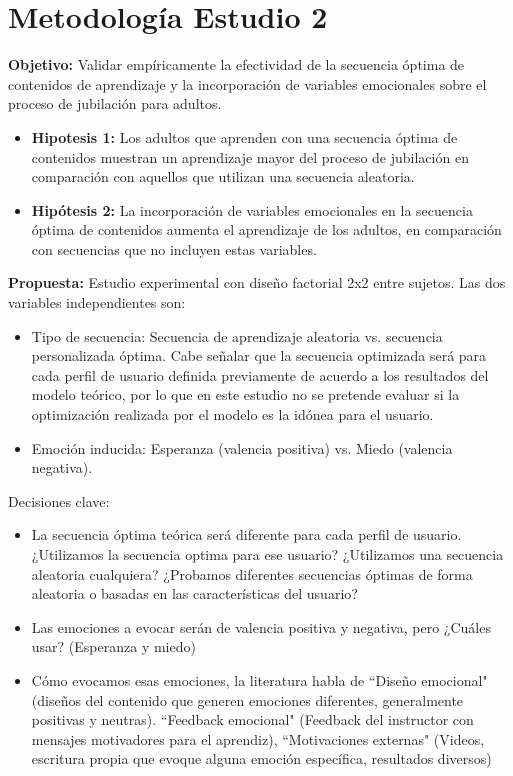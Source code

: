 \newpage

\section*{Metodología Estudio 2}

 \textbf{Objetivo:} Validar empíricamente la efectividad de la secuencia óptima de contenidos de aprendizaje y la incorporación de variables emocionales  sobre el proceso de jubilación para adultos.
 \begin{itemize}
     \item \textbf{Hipotesis 1:} Los adultos que aprenden con una secuencia óptima de contenidos muestran un aprendizaje mayor del proceso de jubilación en comparación con aquellos que utilizan una secuencia aleatoria.
     \item \textbf{Hipótesis 2:} La incorporación de variables emocionales en la secuencia óptima de contenidos aumenta el aprendizaje de los adultos, en comparación con secuencias que no incluyen estas variables.
 \end{itemize}

\textbf{Propuesta:}
Estudio experimental con diseño factorial 2x2 entre sujetos. Las dos variables independientes son:
\begin{itemize}
    \item  Tipo de secuencia: Secuencia de aprendizaje aleatoria vs. secuencia personalizada óptima. Cabe señalar que la secuencia optimizada será para cada perfil de usuario definida previamente de acuerdo a los resultados del modelo teórico, por lo que en este estudio no se pretende evaluar si la optimización realizada por el modelo es la idónea para el usuario. 
    \item  Emoción inducida: Esperanza (valencia positiva) vs. Miedo (valencia negativa).
\end{itemize}
   

   




Decisiones clave: 
\begin{itemize}
    \item La secuencia óptima teórica será diferente para cada perfil de usuario. ¿Utilizamos la secuencia optima para ese usuario? ¿Utilizamos una secuencia aleatoria cualquiera? ¿Probamos diferentes secuencias óptimas de forma aleatoria o basadas en las características del usuario?
    \item Las emociones a evocar serán de valencia positiva y negativa, pero ¿Cuáles usar? (Esperanza y miedo) 
    \item Cómo evocamos esas emociones, la literatura habla de ``Diseño emocional" (diseños del contenido que generen emociones diferentes, generalmente positivas y neutras). ``Feedback emocional" (Feedback del instructor con mensajes motivadores para el aprendiz), ``Motivaciones externas" (Videos, escritura propia que evoque alguna emoción específica, resultados diversos)  
\end{itemize}

